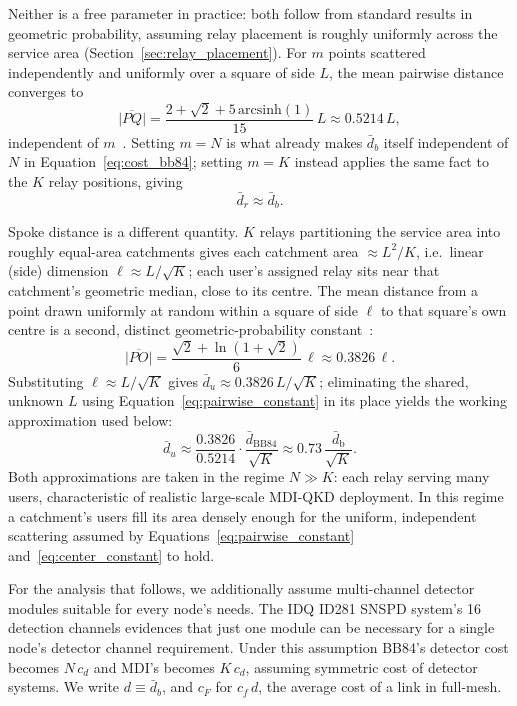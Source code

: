 \documentclass[12pt]{article}
\begin{document}
Neither is a free parameter in practice: both follow from standard results in geometric probability, assuming relay placement is roughly uniformly across the service area (Section~\ref{sec:relay_placement}). For $m$ points scattered independently and uniformly over a square of side $L$, the mean pairwise distance converges to
\begin{equation}
    \overline{|PQ|} = \frac{2+\sqrt2+5\,\mathrm{arcsinh}(1)}{15}\,L \approx 0.5214\,L,
    \label{eq:pairwise_constant}
\end{equation}
independent of $m$~\cite{Finch_2003}. Setting $m=N$ is what already makes $\bar d_b$ itself independent of $N$ in Equation~\ref{eq:cost_bb84}; setting $m=K$ instead applies the same fact to the $K$ relay positions, giving
\begin{equation}
    \bar d_r \approx \bar d_b.
    \label{eq:dr_approx}
\end{equation}

Spoke distance is a different quantity. $K$ relays partitioning the service area into roughly equal-area catchments gives each catchment area $\approx L^2/K$, i.e.\ linear (side) dimension $\ell\approx L/\sqrt K$; each user's assigned relay sits near that catchment's geometric median, close to its centre. The mean distance from a point drawn uniformly at random within a square of side $\ell$ to that square's own centre is a second, distinct geometric-probability constant~\cite{Finch_2003}:
\begin{equation}
    \overline{|PO|} = \frac{\sqrt2+\ln(1+\sqrt2)}{6}\,\ell \approx 0.3826\,\ell.
    \label{eq:center_constant}
\end{equation}
Substituting $\ell\approx L/\sqrt K$ gives $\bar d_u \approx 0.3826\,L/\sqrt K$; eliminating the shared, unknown $L$ using Equation~\ref{eq:pairwise_constant} in its place yields the working approximation used below:
\begin{equation}
    \bar d_u \approx \frac{0.3826}{0.5214}\cdot\frac{\bar d_\text{BB84}}{\sqrt K} \approx 0.73\,\frac{\bar d_\text{b}}{\sqrt K}.
    \label{eq:du_approx}
\end{equation}
Both approximations are taken in the regime $N \gg K$: each relay serving many users, characteristic of realistic large-scale MDI-QKD deployment. In this regime a catchment's users fill its area densely enough for the uniform, independent scattering assumed by Equations~\ref{eq:pairwise_constant} and~\ref{eq:center_constant} to hold.

For the analysis that follows, we additionally assume multi-channel detector modules suitable for every node's needs. The IDQ ID281 SNSPD system's 16 detection channels evidences that just one module can be necessary for a single node's detector channel requirement. Under this assumption BB84's detector cost becomes $N\,c_d$ and MDI's becomes $K\,c_d$, assuming symmetric cost of detector systems. We write $d\equiv\bar d_b$, and $c_F$ for $c_f\,d$, the average cost of a link in full-mesh.
\end{document}
